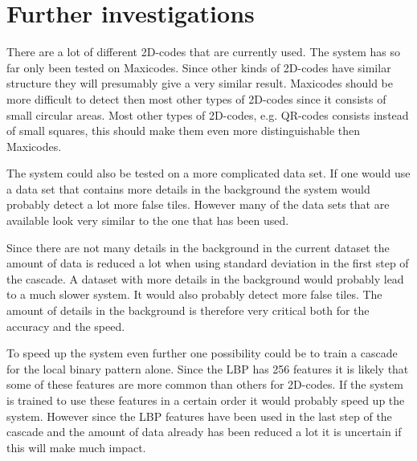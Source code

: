 \chapter{Further investigations}
\label{sec:Further investigations}
There are a lot of different 2D-codes that are currently used. The system has so far only been tested on Maxicodes. Since other kinds of 2D-codes have similar structure they will presumably give a very similar result. Maxicodes should be more difficult to detect then most other types of 2D-codes since it consists of small circular areas. Most other types of 2D-codes, e.g. QR-codes consists instead of small squares, this should make them even more distinguishable then Maxicodes.

The system could also be tested on a more complicated data set. If one would use a data set that contains more details in the background the system would probably detect a lot more false tiles. However many of the data sets that are available look very similar to the one that has been used.

Since there are not many details in the background in the current dataset the amount of data is reduced a lot when using standard deviation in the first step of the cascade. A dataset with more details in the background would probably lead to a much slower system. It would also probably detect more false tiles. The amount of details in the background is therefore very critical both for the accuracy and the speed.

To speed up the system even further one possibility could be to train a cascade for the local binary pattern alone. Since the LBP has 256 features it is likely that some of these features are more common than others for 2D-codes. If the system is trained to use these features in a certain order it would probably speed up the system. However since the LBP features have been used in the last step of the cascade and the amount of data already has been reduced a lot it is uncertain if this will make much impact.
 
